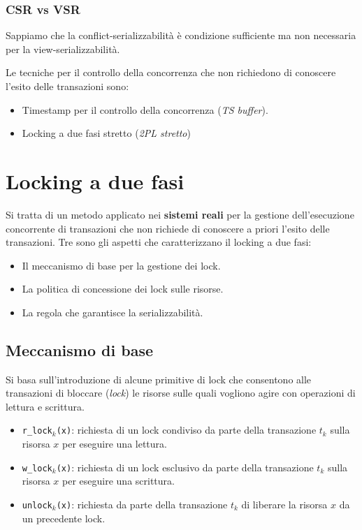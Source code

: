 \documentclass[oneside,a4paper,11pt]{book}
\theoremstyle{italicstyle}
\theoremstyle{normStyle}
\begin{document}
\subsubsection{CSR vs VSR}
Sappiamo che la conflict-serializzabilità è condizione 
sufficiente ma non necessaria per la view-serializzabilità.
\begin{figure}[H]
  \centering
\end{figure}
Le tecniche per il controllo della concorrenza che non richiedono di conoscere 
l'esito delle transazioni sono:
\begin{itemize}
  \item Timestamp per il controllo della concorrenza (\textit{TS buffer}).
  \item Locking a due fasi stretto (\textit{2PL stretto})
\end{itemize}
\section{Locking a due fasi}
Si tratta di un metodo applicato nei \textbf{sistemi reali} per la gestione dell'esecuzione 
concorrente di transazioni che non richiede di conoscere a priori l'esito delle transazioni.
Tre sono gli aspetti che caratterizzano il locking a due fasi:
\begin{itemize}
  \item Il meccanismo di base per la gestione dei lock.
  \item La politica di concessione dei lock sulle risorse.
  \item La regola che garantisce la serializzabilità.
\end{itemize}
\subsection{Meccanismo di base}
Si basa sull'introduzione di alcune primitive di lock che consentono alle transazioni 
di bloccare (\textit{lock}) le risorse sulle quali vogliono agire con operazioni 
di lettura e scrittura.
\begin{itemize}
  \item \verb|r_lock|$_k$\verb|(x)|: richiesta di un lock condiviso da parte 
  della transazione $t_k$ sulla risorsa $x$ per eseguire una lettura.
  \item \verb|w_lock|$_k$\verb|(x)|: richiesta di un lock esclusivo da parte della transazione 
  $t_k$ sulla risorsa $x$ per eseguire una scrittura.
  \item \verb|unlock|$_k$\verb|(x)|: richiesta da parte della transazione $t_k$
  di liberare la risorsa $x$ da un precedente lock.
\end{itemize}
\end{document}
